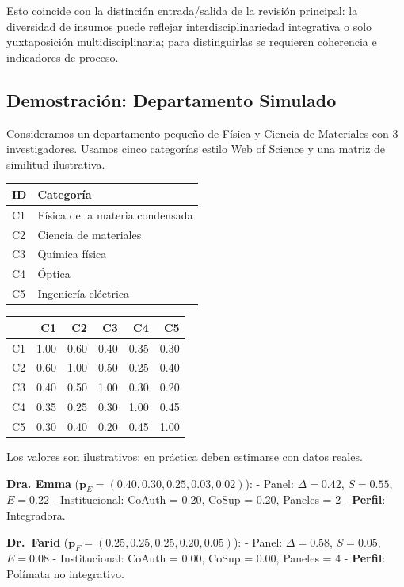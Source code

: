 \documentclass[
]{article}
\begin{document}
Esto coincide con la distinción entrada/salida de la revisión principal:
la diversidad de insumos puede reflejar interdisciplinariedad
integrativa o solo yuxtaposición multidisciplinaria; para distinguirlas
se requieren coherencia e indicadores de proceso.

\hypertarget{demostraciuxf3n-departamento-simulado}{%
\subsection{Demostración: Departamento
Simulado}\label{demostraciuxf3n-departamento-simulado}}

Consideramos un departamento pequeño de Física y Ciencia de Materiales
con 3 investigadores. Usamos cinco categorías estilo Web of Science y
una matriz de similitud ilustrativa.

\begin{longtable}[]{@{}ll@{}}
\toprule
ID & Categoría \\
\midrule
\endhead
C1 & Física de la materia condensada \\
C2 & Ciencia de materiales \\
C3 & Química física \\
C4 & Óptica \\
C5 & Ingeniería eléctrica \\
\bottomrule
\end{longtable}

\begin{longtable}[]{@{}lrrrrr@{}}
\toprule
& C1 & C2 & C3 & C4 & C5 \\
\midrule
\endhead
C1 & 1.00 & 0.60 & 0.40 & 0.35 & 0.30 \\
C2 & 0.60 & 1.00 & 0.50 & 0.25 & 0.40 \\
C3 & 0.40 & 0.50 & 1.00 & 0.30 & 0.20 \\
C4 & 0.35 & 0.25 & 0.30 & 1.00 & 0.45 \\
C5 & 0.30 & 0.40 & 0.20 & 0.45 & 1.00 \\
\bottomrule
\end{longtable}

Los valores son ilustrativos; en práctica deben estimarse con datos
reales.

\textbf{Dra. Emma} (\(\mathbf{p}_E = (0.40, 0.30, 0.25, 0.03, 0.02)\)):
- Panel: \(\Delta = 0.42\), \(S = 0.55\), \(E = 0.22\) - Institucional:
CoAuth = 0.20, CoSup = 0.20, Paneles = 2 - \textbf{Perfil}: Integradora.

\textbf{Dr.~Farid} (\(\mathbf{p}_F = (0.25, 0.25, 0.25, 0.20, 0.05)\)):
- Panel: \(\Delta = 0.58\), \(S = 0.05\), \(E = 0.08\) - Institucional:
CoAuth = 0.00, CoSup = 0.00, Paneles = 4 - \textbf{Perfil}: Polímata no
integrativo.
\end{document}
